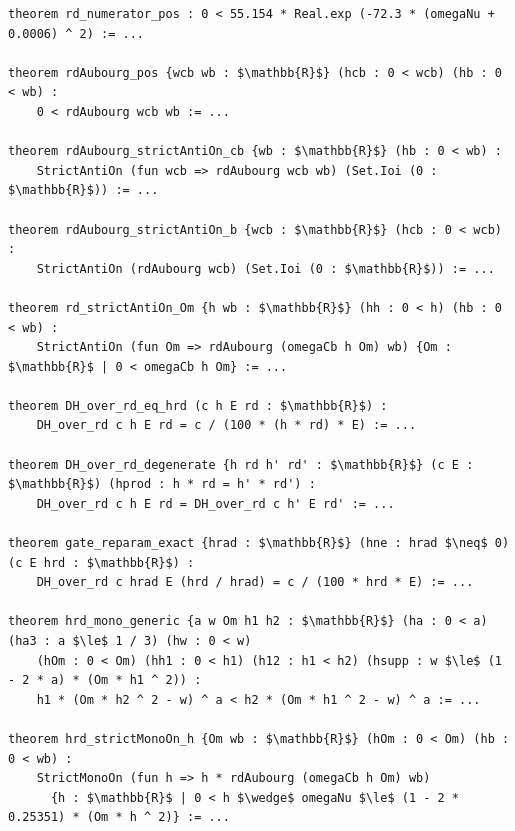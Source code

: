 \begin{lstlisting}[mathescape]
theorem rd_numerator_pos : 0 < 55.154 * Real.exp (-72.3 * (omegaNu + 0.0006) ^ 2) := ...

theorem rdAubourg_pos {wcb wb : $\mathbb{R}$} (hcb : 0 < wcb) (hb : 0 < wb) :
    0 < rdAubourg wcb wb := ...

theorem rdAubourg_strictAntiOn_cb {wb : $\mathbb{R}$} (hb : 0 < wb) :
    StrictAntiOn (fun wcb => rdAubourg wcb wb) (Set.Ioi (0 : $\mathbb{R}$)) := ...

theorem rdAubourg_strictAntiOn_b {wcb : $\mathbb{R}$} (hcb : 0 < wcb) :
    StrictAntiOn (rdAubourg wcb) (Set.Ioi (0 : $\mathbb{R}$)) := ...

theorem rd_strictAntiOn_Om {h wb : $\mathbb{R}$} (hh : 0 < h) (hb : 0 < wb) :
    StrictAntiOn (fun Om => rdAubourg (omegaCb h Om) wb) {Om : $\mathbb{R}$ | 0 < omegaCb h Om} := ...

theorem DH_over_rd_eq_hrd (c h E rd : $\mathbb{R}$) :
    DH_over_rd c h E rd = c / (100 * (h * rd) * E) := ...

theorem DH_over_rd_degenerate {h rd h' rd' : $\mathbb{R}$} (c E : $\mathbb{R}$) (hprod : h * rd = h' * rd') :
    DH_over_rd c h E rd = DH_over_rd c h' E rd' := ...

theorem gate_reparam_exact {hrad : $\mathbb{R}$} (hne : hrad $\neq$ 0) (c E hrd : $\mathbb{R}$) :
    DH_over_rd c hrad E (hrd / hrad) = c / (100 * hrd * E) := ...

theorem hrd_mono_generic {a w Om h1 h2 : $\mathbb{R}$} (ha : 0 < a) (ha3 : a $\le$ 1 / 3) (hw : 0 < w)
    (hOm : 0 < Om) (hh1 : 0 < h1) (h12 : h1 < h2) (hsupp : w $\le$ (1 - 2 * a) * (Om * h1 ^ 2)) :
    h1 * (Om * h2 ^ 2 - w) ^ a < h2 * (Om * h1 ^ 2 - w) ^ a := ...

theorem hrd_strictMonoOn_h {Om wb : $\mathbb{R}$} (hOm : 0 < Om) (hb : 0 < wb) :
    StrictMonoOn (fun h => h * rdAubourg (omegaCb h Om) wb)
      {h : $\mathbb{R}$ | 0 < h $\wedge$ omegaNu $\le$ (1 - 2 * 0.25351) * (Om * h ^ 2)} := ...
\end{lstlisting}
